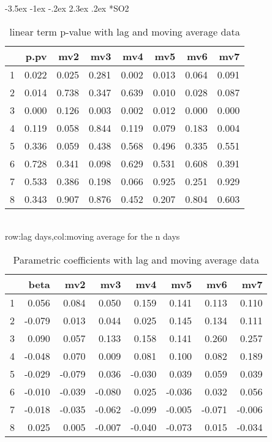\documentclass[a4paper, 12pt]{article}
\makeatletter
\def\large{\fontsize{14}{20}\selectfont}
\renewcommand\subsection{\@startsection {subsection}{1}{\z@}%
                                   {-3.5ex \@plus -1ex \@minus -.2ex}%
                                   {2.3ex \@plus.2ex}%
                                   {\centering\normalfont\large\bfseries}}
\makeatother
\begin{document}
\subsection*{SO2}
\begin{table}[h]
\centering
\caption{linear term p-value with lag and moving average data}
\begin{tabular}{rrrrrrrr}
  \hline
 & p.pv & mv2 & mv3 & mv4 & mv5 & mv6 & mv7 \\
  \hline
1 & 0.022 & 0.025 & 0.281 & 0.002 & 0.013 & 0.064 & 0.091 \\
  2 & 0.014 & 0.738 & 0.347 & 0.639 & 0.010 & 0.028 & 0.087 \\
  3 & 0.000 & 0.126 & 0.003 & 0.002 & 0.012 & 0.000 & 0.000 \\
  4 & 0.119 & 0.058 & 0.844 & 0.119 & 0.079 & 0.183 & 0.004 \\
  5 & 0.336 & 0.059 & 0.438 & 0.568 & 0.496 & 0.335 & 0.551 \\
  6 & 0.728 & 0.341 & 0.098 & 0.629 & 0.531 & 0.608 & 0.391 \\
  7 & 0.533 & 0.386 & 0.198 & 0.066 & 0.925 & 0.251 & 0.929 \\
  8 & 0.343 & 0.907 & 0.876 & 0.452 & 0.207 & 0.804 & 0.603 \\
   \hline
\end{tabular}
\\row:lag days,col:moving average for the n days
\end{table}

\begin{table}[h]
\centering
\caption{Parametric coefficients with lag and moving average data}
\begin{tabular}{rrrrrrrr}
  \hline
 & beta & mv2 & mv3 & mv4 & mv5 & mv6 & mv7 \\
  \hline
1 & 0.056 & 0.084 & 0.050 & 0.159 & 0.141 & 0.113 & 0.110 \\
  2 & -0.079 & 0.013 & 0.044 & 0.025 & 0.145 & 0.134 & 0.111 \\
  3 & 0.090 & 0.057 & 0.133 & 0.158 & 0.141 & 0.260 & 0.257 \\
  4 & -0.048 & 0.070 & 0.009 & 0.081 & 0.100 & 0.082 & 0.189 \\
  5 & -0.029 & -0.079 & 0.036 & -0.030 & 0.039 & 0.059 & 0.039 \\
  6 & -0.010 & -0.039 & -0.080 & 0.025 & -0.036 & 0.032 & 0.056 \\
  7 & -0.018 & -0.035 & -0.062 & -0.099 & -0.005 & -0.071 & -0.006 \\
  8 & 0.025 & 0.005 & -0.007 & -0.040 & -0.073 & 0.015 & -0.034 \\
   \hline
\end{tabular}
\end{table}
\clearpage
\end{document}
